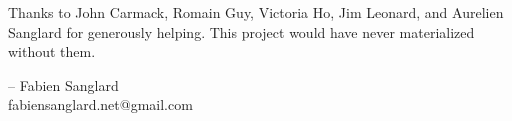 Thanks to John Carmack, Romain Guy, Victoria Ho, Jim Leonard, and Aurelien Sanglard for generously helping. This project would have never
materialized without them.\\ 
\par
-- Fabien Sanglard\\
fabiensanglard.net@gmail.com
